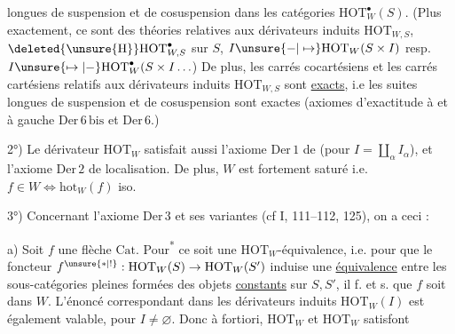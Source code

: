 
longues de suspension et de cosuspension dans
les catégories $\mathrm{HOT}_{W}^{\bullet}(S)$. (Plus exactement, ce sont
des théories relatives aux dérivateurs induits
$\mathrm{HOT}_{W,S}$, $\deleted{\unsure{\mathrm H}}\mathrm{HOT}_{W,S}^{\bullet}$ sur $S$, $I\unsure{-|\mapsto}\mathrm{HOT}_{W}(S\times I)$ resp.
$I\unsure{\mapsto|-}\mathrm{HOT}_{W}^{\bullet}(S\times I\ldots$) De plus, les carrés
cocartésiens et les carrés cartésiens relatifs
aux dérivateurs induits $\mathrm{HOT}_{W,S}$ sont
\uline{exacts}, i.e les suites  longues
de suspension et de cosuspension sont
exactes (axiomes d'exactitude à  
et à gauche $\mathrm{Der}\,6\,\mathrm{bis}$ et $\mathrm{Der}\,6$.)

2°) Le dérivateur $\mathrm{HOT}_{W}$ satisfait aussi
l'axiome $\mathrm{Der}\,1$ de 
(pour $I=\coprod_{\alpha}I_{\alpha}$),
 et l'axiome $\mathrm{Der}\,2$ de localisation.
De plus, $W$ est fortement saturé i.e. $f\in W\Longleftrightarrow\mathrm{hot}_{W}(f)$ iso.

3°) Concernant l'axiome $\mathrm{Der}\,3$ et ses variantes
(cf I,  111--112, 125), on a  ceci :

 a) 
Soit $f$  une flèche  $\mathrm{Cat}$. Pour\textsuperscript{*}
 ce soit une $\mathrm{HOT}_{W}$-équivalence, i.e. pour
que le foncteur $f^{\unsure{*|!}}:\mathrm{HOT}_{W}(S)\to\mathrm{HOT}_{W}(S')$ induise une
\uline{équivalence} entre les sous-catégories pleines
formées des  objets \uline{constants} sur $S,S'$, il f. et
s. que $f$ soit dans $W$.  L'énoncé correspondant dans les dérivateurs induits $\mathrm{HOT}_{W}(I)$
est  également valable, pour $I\ne\varnothing$. Donc
à fortiori, $\mathrm{HOT}_{W}$ et $\mathrm{HOT}_{W}$ satisfont
